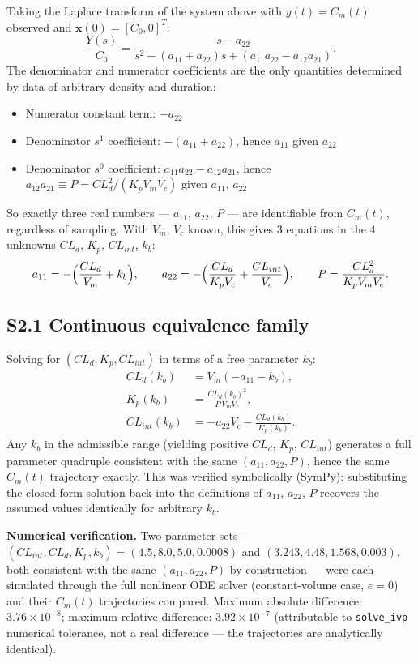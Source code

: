\documentclass[11pt]{article}
\begin{document}
Taking the Laplace transform of the system above with $y(t)=C_m(t)$ observed and $\mathbf{x}(0)=[C_0,0]^T$:
\[
\frac{Y(s)}{C_0} = \frac{s-a_{22}}{s^2-(a_{11}+a_{22})s+(a_{11}a_{22}-a_{12}a_{21})}.
\]
The denominator and numerator coefficients are the only quantities determined by data of arbitrary density and duration:
\begin{itemize}
\item Numerator constant term: $-a_{22}$
\item Denominator $s^1$ coefficient: $-(a_{11}+a_{22})$, hence $a_{11}$ given $a_{22}$
\item Denominator $s^0$ coefficient: $a_{11}a_{22}-a_{12}a_{21}$, hence $a_{12}a_{21} \equiv P = CL_d^2/(K_pV_mV_c)$ given $a_{11}$, $a_{22}$
\end{itemize}
So exactly three real numbers --- $a_{11}$, $a_{22}$, $P$ --- are identifiable from $C_m(t)$, regardless of sampling. With $V_m$, $V_c$ known, this gives 3 equations in the 4 unknowns $CL_d$, $K_p$, $CL_{int}$, $k_b$:
\[
a_{11}=-\Bigl(\frac{CL_d}{V_m}+k_b\Bigr), \qquad a_{22}=-\Bigl(\frac{CL_d}{K_pV_c}+\frac{CL_{int}}{V_c}\Bigr), \qquad P=\frac{CL_d^2}{K_pV_mV_c}.
\]

\subsection*{S2.1 Continuous equivalence family}

Solving for $(CL_d, K_p, CL_{int})$ in terms of a free parameter $k_b$:
\begin{align}
CL_d(k_b) &= V_m(-a_{11}-k_b), \\
K_p(k_b) &= \frac{CL_d(k_b)^2}{P\,V_m V_c}, \\
CL_{int}(k_b) &= -a_{22}V_c - \frac{CL_d(k_b)}{K_p(k_b)}.
\end{align}
Any $k_b$ in the admissible range (yielding positive $CL_d$, $K_p$, $CL_{int}$) generates a full parameter quadruple consistent with the same $(a_{11}, a_{22}, P)$, hence the same $C_m(t)$ trajectory exactly. This was verified symbolically (SymPy): substituting the closed-form solution back into the definitions of $a_{11}$, $a_{22}$, $P$ recovers the assumed values identically for arbitrary $k_b$.

\textbf{Numerical verification.} Two parameter sets --- $(CL_{int}, CL_d, K_p, k_b) = (4.5, 8.0, 5.0, 0.0008)$ and $(3.243, 4.48, 1.568, 0.003)$, both consistent with the same $(a_{11}, a_{22}, P)$ by construction --- were each simulated through the full nonlinear ODE solver (constant-volume case, $e=0$) and their $C_m(t)$ trajectories compared. Maximum absolute difference: $3.76\times10^{-8}$; maximum relative difference: $3.92\times10^{-7}$ (attributable to \texttt{solve\_ivp} numerical tolerance, not a real difference --- the trajectories are analytically identical).
\end{document}
